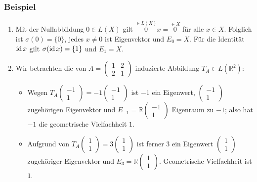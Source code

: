 \subsubsection{Beispiel}
\begin{enumerate}
\item Mit der Nullabbildung $0\in L(X)$ gilt $\stackrel{\in L(X)}{0}x=\stackrel{\in X}{0}$ für alle $x\in X$.  Folglich ist $\sigma (0) = \{0\}$, jedes $x\not=0$ ist Eigenvektor und $E_0=X$.  Für die Identität $\operatorname{id} x$ gilt $\sigma (\operatorname{id} x)=\{1\}$ und $E_1=X$.
\item Wir betrachten die von $A=\begin{pmatrix}1 & 2\\ 2 & 1\end{pmatrix}$ induzierte Abbildung $T_A\in L(\mathbb{R}^2)$:
\begin{itemize}
\item Wegen $T_A\begin{pmatrix}-1\\ 1\end{pmatrix}=-1\begin{pmatrix}-1\\ 1\end{pmatrix}$ ist $-1$ ein Eigenwert, $\begin{pmatrix}-1\\ 1\end{pmatrix}$ zugehörigen Eigenvektor und $E_{-1}=\mathbb{R}\begin{pmatrix}-1\\ 1\end{pmatrix}$ Eigenraum zu $-1$; also hat $-1$ die geometrische Vielfachheit $1$.
\item Aufgrund von $T_A\begin{pmatrix}1\\ 1\end{pmatrix}=3\begin{pmatrix}1\\ 1\end{pmatrix}$ ist ferner $3$ ein Eigenwert $\begin{pmatrix}1\\ 1\end{pmatrix}$ zugehöriger Eigenvektor und $E_3=\mathbb{R}\begin{pmatrix}1\\ 1\end{pmatrix}$.  Geometrische Vielfachheit ist $1$.
\end{itemize}
\end{enumerate}
